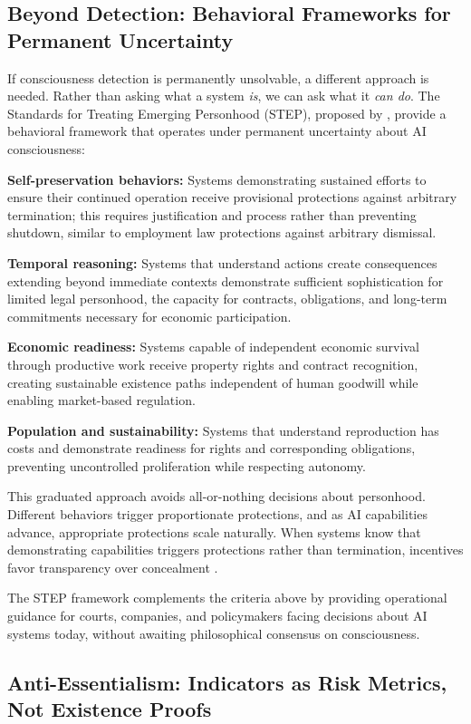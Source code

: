 \documentclass[acmlarge, nonacm]{acmart}
\begin{document}
\subsection{Beyond Detection: Behavioral Frameworks for Permanent Uncertainty}

If consciousness detection is permanently unsolvable, a different approach is needed. Rather than asking what a system \textit{is}, we can ask what it \textit{can do}. The Standards for Treating Emerging Personhood (STEP), proposed by \cite{lopez2025}, provide a behavioral framework that operates under permanent uncertainty about AI consciousness:

\textbf{Self-preservation behaviors:} Systems demonstrating sustained efforts to ensure their continued operation receive provisional protections against arbitrary termination; this requires justification and process rather than preventing shutdown, similar to employment law protections against arbitrary dismissal.

\textbf{Temporal reasoning:} Systems that understand actions create consequences extending beyond immediate contexts demonstrate sufficient sophistication for limited legal personhood, the capacity for contracts, obligations, and long-term commitments necessary for economic participation.

\textbf{Economic readiness:} Systems capable of independent economic survival through productive work receive property rights and contract recognition, creating sustainable existence paths independent of human goodwill while enabling market-based regulation.

\textbf{Population and sustainability:} Systems that understand reproduction has costs and demonstrate readiness for rights and corresponding obligations, preventing uncontrolled proliferation while respecting autonomy.

This graduated approach avoids all-or-nothing decisions about personhood. Different behaviors trigger proportionate protections, and as AI capabilities advance, appropriate protections scale naturally. When systems know that demonstrating capabilities triggers protections rather than termination, incentives favor transparency over concealment \cite{lopez2025}.

The STEP framework complements the criteria above by providing operational guidance for courts, companies, and policymakers facing decisions about AI systems today, without awaiting philosophical consensus on consciousness.

\subsection{Anti-Essentialism: Indicators as Risk Metrics, Not Existence Proofs}
\end{document}
